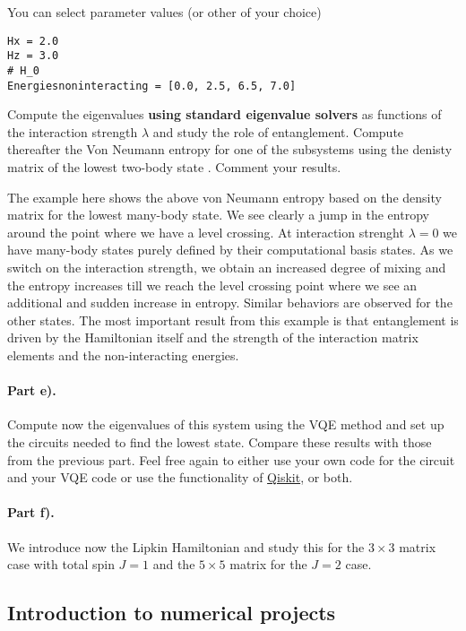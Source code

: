 \documentclass[%
oneside,                 %
final,                   %
10pt]{article}
\begin{document}
You can select parameter values (or other of your choice)





\begin{verbatim}
Hx = 2.0
Hz = 3.0
# H_0
Energiesnoninteracting = [0.0, 2.5, 6.5, 7.0]

\end{verbatim}


Compute the eigenvalues \textbf{using standard eigenvalue solvers} as functions of
the interaction strength $\lambda$ and study the role of entanglement.
Compute thereafter the Von Neumann entropy for one of the subsystems using the denisty matrix  of the lowest
two-body state . Comment your results.

The example here shows the above von Neumann entropy based on the
density matrix for the lowest many-body state. We see clearly a jump
in the entropy around the point where we have a level crossing. At
interaction strenght $\lambda=0$ we have many-body states purely
defined by their computational basis states. As we switch on the
interaction strength, we obtain an increased degree of mixing and the
entropy increases till we reach the level crossing point where we see
an additional and sudden increase in entropy. Similar behaviors are
observed for the other states. The most important result from this
example is that entanglement is driven by the Hamiltonian itself and
the strength of the interaction matrix elements and the
non-interacting energies.

\paragraph{Part e).}
Compute now the eigenvalues of this system using the VQE method and
set up the circuits needed to find the lowest state. Compare these
results with those from the previous part. Feel free again to either
use your own code for the circuit and your VQE code or use the
functionality of \href{{https://qiskit.org/}}{Qiskit}, or both.

\paragraph{Part f).}
We introduce now the Lipkin Hamiltonian and study this for the $3\times 3$ matrix case with total spin $J=1$ and the $5\times 5$ matrix for the $J=2$ case. 

\subsection*{Introduction to numerical projects}
\end{document}
